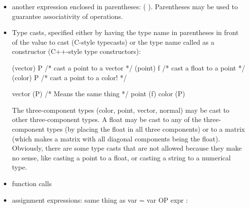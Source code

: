 \documentclass[11pt,letterpaper]{book}
\def\color{{\cf color}\xspace}
\def\float{{\cf float}\xspace}
\def\inttype{{\cf int}\xspace}
\def\normal{{\cf normal}\xspace}
\def\point{{\cf point}\xspace}
\def\vector{{\cf vector}\xspace}
\begin{document}
\begin{itemize}
\hspace{0.5in}  \emph{expr1} {\cf \&\&} \emph{expr2}

\hspace{0.5in}    \emph{expr1} {\cf ||} \emph{expr2}

For the logical operators, numeric expressions (\inttype or \float) are
considered \emph{true} if nonzero, \emph{false} if zero.
Multi-component types (such as \color) are considered \emph{true} any
component is nonzero, \emph{false} all components are zero.  Strings are
considered \emph{true} if they are nonempty, \emph{false} if they are
the empty string (\qkw{}).

\item another expression enclosed in parentheses: {\cf ( )}.
  Parentheses may be used to guarantee associativity of operations.

\item Type casts, specified either by having the type name in 
parentheses in front of the value to cast (C-style typecasts)
or the type name called as a constructor (C++-style type constructors):
\begin{code}
        (vector) P            /* cast a point to a vector */
        (point) f             /* cast a float to a point */
        (color) P             /* cast a point to a color! */

        vector (P)            /* Means the same thing */
        point (f)
        color (P)
\end{code}

The three-component types (\color, \point, \vector, \normal)
may be cast to other three-component types.  A \float
may be cast to any of the three-component types (by placing the
float in all three components) or to a {\cf matrix} (which makes a
matrix with all diagonal components being the {\cf float}).
Obviously, there are some type casts that are not allowed because
they make no sense, like casting a {\cf point} to a {\cf float}, or
casting a {\cf string} to a numerical type.

\item function calls

\item assignment expressions:
same thing as {\cf var = var OP expr} :


\end{itemize}
\end{document}
